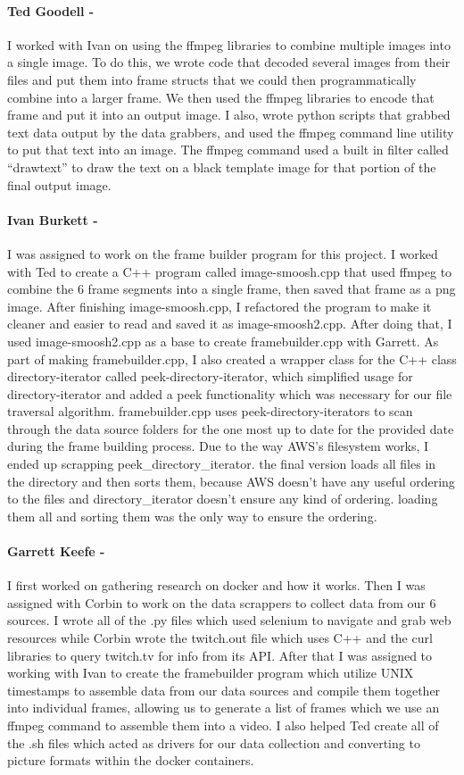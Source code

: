 \documentclass{article}
\begin{document}
    \paragraph{Ted Goodell -}
    I worked with Ivan on using the ffmpeg libraries to combine multiple images into a single image. To do this, we wrote code that decoded several images from their files and put them into frame structs that we could then programmatically combine into a larger frame. We then used the ffmpeg libraries to encode that frame and put it into an output image. I also, wrote python scripts that grabbed text data output by the data grabbers, and used the ffmpeg command line utility to put that text into an image. The ffmpeg command used a built in filter called “drawtext” to draw the text on a black template image for that portion of the final output image.
    \paragraph{Ivan Burkett -}
    I was assigned to work on the frame builder program for this project. I worked with Ted to create a C++ program called image-smoosh.cpp that used ffmpeg to combine the 6 frame segments into a single frame, then saved that frame as a png image. After finishing image-smoosh.cpp, I refactored the program to make it cleaner and easier to read and saved it as image-smoosh2.cpp. After doing that, I used image-smoosh2.cpp as a base to create framebuilder.cpp with Garrett. As part of making framebuilder.cpp, I also created a wrapper class for the C++ class directory-iterator called peek-directory-iterator, which simplified usage for directory-iterator and added a peek functionality which was necessary for our file traversal algorithm. framebuilder.cpp uses peek-directory-iterators to scan through the data source folders for the one most up to date for the provided date during the frame building process. Due to the way AWS's filesystem works, I ended up scrapping peek\_directory\_iterator. the final version loads all files in the directory and then sorts them, because AWS doesn't have any useful ordering to the files and directory\_iterator doesn't ensure any kind of ordering. loading them all and sorting them was the only way to ensure the ordering.
    \paragraph{Garrett Keefe -}
    I first worked on gathering research on docker and how it works. Then I was assigned with Corbin to work on the data scrappers to collect data from our 6 sources. I wrote all of the .py files which used selenium to navigate and grab web resources while Corbin wrote the twitch.out file which uses C++ and the curl libraries to query twitch.tv for info from its API. After that I was assigned to working with Ivan to create the framebuilder program which utilize UNIX timestamps to assemble data from our data sources and compile them together into individual frames, allowing us to generate a list of frames which we use an ffmpeg command to assemble them into a video. I also helped Ted create all of the .sh files which acted as drivers for our data collection and converting to picture formats within the docker containers.
\end{document}
